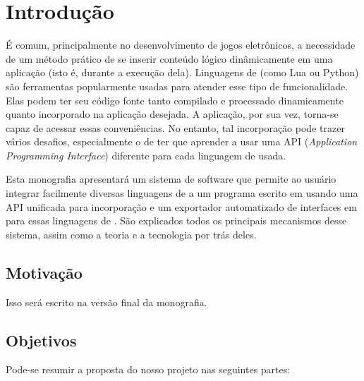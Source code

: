 
\chapter{Introdução}
\label{sec:intr}

É comum, principalmente no desenvolvimento de jogos eletrônicos, a necessidade
de um método prático de se inserir conteúdo lógico dinâmicamente em uma
aplicação (isto é, durante a execução dela). Linguagens de \script{} (como Lua ou
Python) são ferramentas popularmente usadas para atender esse tipo de
funcionalidade. Elas podem ter seu código fonte tanto compilado e processado
dinamicamente quanto incorporado na aplicação desejada. A aplicação, por sua
vez, torna-se capaz de acessar essas conveniências. No entanto, tal incorporação
pode trazer vários desafios, especialmente o de ter que aprender a usar uma API
(\textit{Application Programming Interface}) diferente para cada linguagem de
\script{} usada.

Esta monografia apresentará um sistema de software que permite ao usuário
integrar facilmente diversas linguagens de \script{} a um programa escrito em
\CXX{} usando uma API unificada para incorporação e um exportador
automatizado de interfaces em \CXX{} para essas linguagens de \script{}. São
explicados todos os principais mecanismos desse sistema, assim como a teoria e a
tecnologia por trás deles.

\section{Motivação}
\label{sec:intr:motivacao}

Isso será escrito na versão final da monografia.

\section{Objetivos}
\label{sec:intr:objetivos}

Pode-se resumir a proposta do nosso projeto nas seguintes partes:

